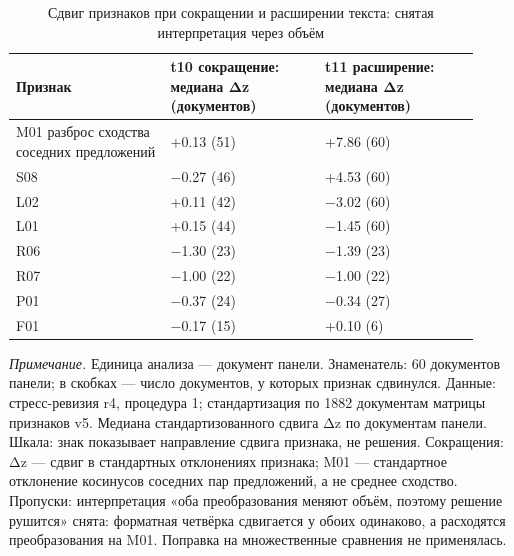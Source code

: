 \begin{table}[htbp]
\centering
\small
\caption{Сдвиг признаков при сокращении и расширении текста: снятая интерпретация через объём}
\label{tab:s15}
\begin{tabular}{>{\raggedright\arraybackslash}p{0.307\linewidth}>{\raggedright\arraybackslash}p{0.307\linewidth}>{\raggedright\arraybackslash}p{0.307\linewidth}}
\toprule
Признак & t10 сокращение: медиана Δz (документов) & t11 расширение: медиана Δz (документов) \\
\midrule
M01 разброс сходства соседних предложений & +0.13 (51) & +7.86 (60) \\
S08 & −0.27 (46) & +4.53 (60) \\
L02 & +0.11 (42) & −3.02 (60) \\
L01 & +0.15 (44) & −1.45 (60) \\
R06 & −1.30 (23) & −1.39 (23) \\
R07 & −1.00 (22) & −1.00 (22) \\
P01 & −0.37 (24) & −0.34 (27) \\
F01 & −0.17 (15) & +0.10 (6) \\
\bottomrule
\end{tabular}
\begin{minipage}{\linewidth}\footnotesize\vspace{2pt}
\textit{Примечание.} Единица анализа — документ панели. Знаменатель: 60 документов панели; в скобках — число документов, у которых признак сдвинулся. Данные: стресс-ревизия r4, процедура 1; стандартизация по 1882 документам матрицы признаков v5. Медиана стандартизованного сдвига Δz по документам панели. Шкала: знак показывает направление сдвига признака, не решения. Сокращения: Δz — сдвиг в стандартных отклонениях признака; M01 — стандартное отклонение косинусов соседних пар предложений, а не среднее сходство. Пропуски: интерпретация «оба преобразования меняют объём, поэтому решение рушится» снята: форматная четвёрка сдвигается у обоих одинаково, а расходятся преобразования на M01. Поправка на множественные сравнения не применялась.
\end{minipage}
\end{table}
